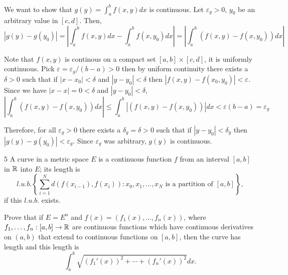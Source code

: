 \documentclass[12pt]{article}
\begin{document}
\begin{solution}
    \bbni    

    We want to show that $g(y) = \int_a^b f(x,y) dx$  is continuous. Let $\varepsilon_g > 0$, $y_0$ be an arbitrary value in $[c,d]$. Then, 
    \[|g(y) - g(y_0)| = \left|\int_a^bf(x,y) dx - \int_a^b f(x, y_0) dx\right| = \left|\int_a^b (f(x,y) -  f(x, y_0) )dx\right|\]
    
    Note that $f(x,y)$ is continous on a compact set $[a,b] \times [c,d]$, it is uniformly continuous. Pick $\varepsilon = \varepsilon_g/(b-a) > 0$ then by uniform continuity there exists a $\delta > 0$ such that if $|x -x_0| < \delta$ and  $|y - y_0| < \delta$ then $|f(x,y) - f(x_0, y_0)| < \varepsilon$. Since we have $|x - x| = 0 < \delta$ and $|y - y_0| < \delta$, 
    \[\left|\int_{a}^{b} (f(x,y) - f(x, y_0)) dx\right| \leq \int_{a}^{b} \left|(f(x,y) - f(x, y_0)) \right| dx < \varepsilon(b-a) = \varepsilon_g \]
   
    Therefore, for all $\varepsilon_g >0$ there exists a $\delta_g  = \delta >0$ such that if $|y - y_0| < \delta_g$ then $|g(y) - g(y_0)| < \varepsilon_g$. Since $\varepsilon_g$ was arbitrary, $g(y)$ is continuous. 
\end{solution}

\newpage

\begin{problem}{5}
    A curve in a metric space $E$ is a continuous function $f$ from an interval $[a,b]$ in $\mathbb R$ into $E$; its length is 
    \[l.u.b.\left \{ \sum_{i=1}^N d(f(x_{i-1}), f(x_i)): x_0, x_1, \ldots, x_N \text{ is a partition of } [a,b]\right \},\]
    if this $l.u.b.$ exists. 
    
    Prove that if $E = E^n$ and $f(x) = (f_1(x),\ldots,f_n(x))$, where $f_1,\ldots, f_n: [a, b] \to \mathbb R$ are continuous functions which have continuous derivatives on $(a, b)$ that extend to continuous functions on $[a, b]$, then the curve has length and this length is
    \[\int_a^b \sqrt{\left(f_1'(x)\right)^2 + \cdots + \left(f_n'(x)\right)^2}dx.\]
\end{problem}
\end{document}
